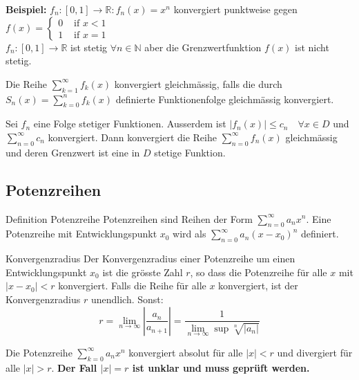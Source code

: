 \documentclass[a4paper,fontsize = 7pt]{scrartcl}
\def\limn{\lim_{n\to \infty}}
\def\sumk{\sum_{k=1}^\infty}
\def\R{\mathbb{R}}
\def\N{\mathbb{N}}
\begin{document}
\vspace{0.5mm}
  \textbf{Beispiel: }$f_n: [0, 1] \to \R: f_n(x) = x^n$ konvergiert punktweise gegen $f(x) = \left\{
    \begin{array}{ll}
      0  & \mbox{ if } x < 1 \\
      1 & \mbox{ if } x = 1
    \end{array}
  \right.$
  \\$f_n: [0, 1] \to \R$ ist stetig $\forall n \in \N$
  aber die Grenzwertfunktion $f(x)$ ist nicht stetig.


Die Reihe $\sumk f_k(x)$ konvergiert gleichmässig, falls die durch $S_n(x) = \sum_{k=0}^n f_k(x)$ definierte Funktionenfolge gleichmässig konvergiert.

\begin{subbox}{}
  \vspace{-4pt}
 Sei $f_n$ eine Folge stetiger Funktionen. Ausserdem ist $|f_n(x)| \le c_n \quad \forall x \in D$ und $\sum_{n=0}^\infty c_n$ konvergiert. Dann konvergiert die Reihe $\sum_{n=0}^\infty f_n(x)$ gleichmässig und deren Grenzwert ist eine in $D$ stetige Funktion.
 \vspace{-4pt}
\end{subbox}

\subsection{Potenzreihen}
\begin{subbox}{Definition Potenzreihe}
\vspace{-4pt}
 Potenzreihen sind Reihen der Form $\sum_{n=0}^\infty a_n x^n$. Eine Potenzreihe mit Entwicklungspunkt $x_0$ wird als $\sum_{n=0}^\infty a_n(x-x_0)^n$ definiert.
 \vspace{-4pt}
\end{subbox}

\begin{mainbox}{Konvergenzradius}
  \vspace{-4pt}
 Der Konvergenzradius einer Potenzreihe um einen Entwicklungspunkt $x_0$ ist die grösste Zahl $r$, so dass die Potenzreihe für alle $x$ mit $|x - x_0| < r$ konvergiert. Falls die Reihe für alle $x$ konvergiert, ist der Konvergenzradius $r$ unendlich. Sonst:
 $$r = \limn \left| \frac{a_n}{a_{n+1}} \right| = \frac{1}{\limn\sup \sqrt[n]{|a_n|}} $$
 \vspace{-12pt}
\end{mainbox}
Die Potenzreihe $\sum_{k=0}^\infty a_n x^n$ konvergiert absolut für alle $|x| < r$ und divergiert für alle $|x| > r$. \textbf{Der Fall $|x| = r$ ist unklar und muss geprüft werden.}
\end{document}
